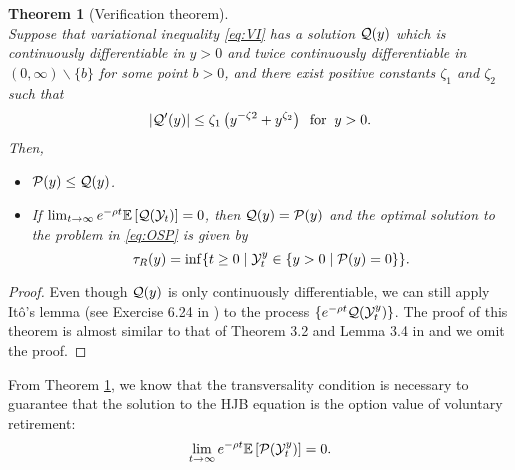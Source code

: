 \documentclass[a4paper,report, 11pt]{article}
\newtheorem{theorem}{Theorem}[section]
\begin{document}
\begin{theorem}[Verification theorem]~\label{thm:verification-OSP}\\
Suppose that  variational inequality \eqref{eq:VI} has a solution ${\cal Q}(y)$ which is continuously differentiable in $y>0$ and twice continuously differentiable in $(0,\infty)\backslash\{b\}$ for some point $b>0$, and there exist positive constants $\zeta_1$ and $\zeta_2$ such that 
\begin{equation*}
|{\cal Q}'(y)|\le \zeta_1\left(y^{-\zeta 2}+y^{\zeta_2}\right)\;\;\mbox{for}\;\;y>0. 
\end{equation*}
	Then, 
	\begin{itemize}
		\item[(a)] ${\cal P}(y) \le {\cal Q}(y)$.
		\item[(b)] If $\lim_{t\to \infty} e^{-\rho t} \mathbb{E}\left[{\cal Q}({\cal Y}_t)\right]=0$, then ${\cal Q}(y)={\cal P}(y)$ and the optimal solution to the problem in \eqref{eq:OSP} is given by 
		$$
		\tau_R(y) = \inf \{t\ge0 \mid {\cal Y}_t^y\in \{y>0\mid {\cal P}(y)=0 \} \}. 
		$$
	\end{itemize}
\end{theorem}
\begin{proof}
	 Even though ${\cal Q}(y)$ is only continuously differentiable, we can still apply It\^{o}'s lemma (see Exercise 6.24 in \citet{KS2}) to the process $\{e^{-\rho t}{\cal Q}({\cal Y}_t^y)\}$. The proof of this theorem is almost similar to that of Theorem 3.2 and Lemma 3.4 in \citet{KMZ} and  we omit the proof.
\end{proof}

From Theorem \ref{thm:verification-OSP}, we know that the transversality condition is necessary to guarantee that the solution to the HJB equation is the option value of voluntary retirement:
\begin{equation}\label{eq:transversality}
\lim_{t\to \infty} e^{-\rho t} \mathbb{E}\left[{\cal P}({\cal Y}_t^y)\right]=0.
\end{equation}
\end{document}
